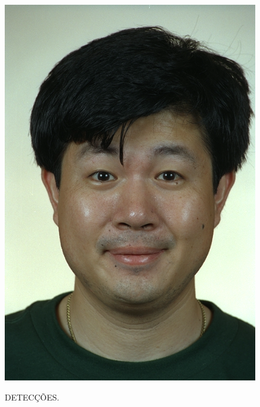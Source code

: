 \begin{figure}[h!]
    \caption{DETECÇÕES.}
    \centering
    \begin{minipage}[b]{0.45\textwidth}
        \centering
        \includegraphics[width=0.9\linewidth]{fig/01_example_image.png}
        \label{fig:imagem}
    \end{minipage}
    \hfill
    \begin{minipage}[b]{0.45\textwidth}
        \centering

\end{minipage}
\end{figure}
